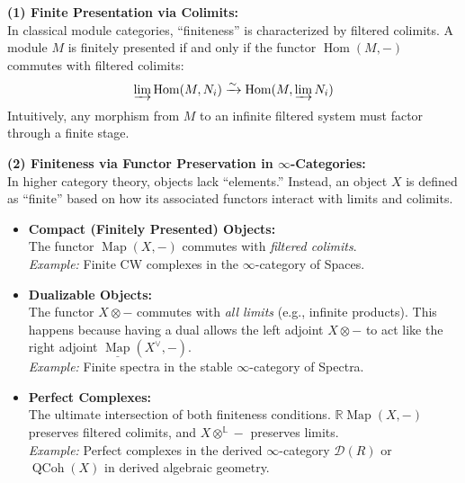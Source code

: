 \begin{remark}
    \textbf{(1) Finite Presentation via Colimits:} \\
    In classical module categories, ``finiteness'' is characterized by filtered colimits. A module $M$ is finitely presented if and only if the functor $\operatorname{Hom}(M, -)$ commutes with filtered colimits:
    \[
        \varinjlim \operatorname{Hom}(M, N_i) \xrightarrow{\sim} \operatorname{Hom}(M, \varinjlim N_i)
    \]
    Intuitively, any morphism from $M$ to an infinite filtered system must factor through a finite stage.

    \vspace{1ex}
    \noindent \textbf{(2) Finiteness via Functor Preservation in $\infty$-Categories:} \\
    In higher category theory, objects lack ``elements.'' Instead, an object $X$ is defined as ``finite'' based on how its associated functors interact with limits and colimits.
    \begin{itemize}
        \item \textbf{Compact (Finitely Presented) Objects:} \\
        The functor $\operatorname{Map}(X, -)$ commutes with \textit{filtered colimits}. \\
        \textit{Example:} Finite CW complexes in the $\infty$-category of Spaces.

        \item \textbf{Dualizable Objects:} \\
        The functor $X \otimes -$ commutes with \textit{all limits} (e.g., infinite products). This happens because having a dual allows the left adjoint $X \otimes -$ to act like the right adjoint $\underline{\operatorname{Map}}(X^\vee, -)$. \\
        \textit{Example:} Finite spectra in the stable $\infty$-category of Spectra.

        \item \textbf{Perfect Complexes:} \\
        The ultimate intersection of both finiteness conditions. $\mathbb{R}\operatorname{Map}(X, -)$ preserves filtered colimits, and $X \otimes^\mathbb{L} -$ preserves limits. \\
        \textit{Example:} Perfect complexes in the derived $\infty$-category $\mathcal{D}(R)$ or $\operatorname{QCoh}(X)$ in derived algebraic geometry.
    \end{itemize}
\end{remark}

